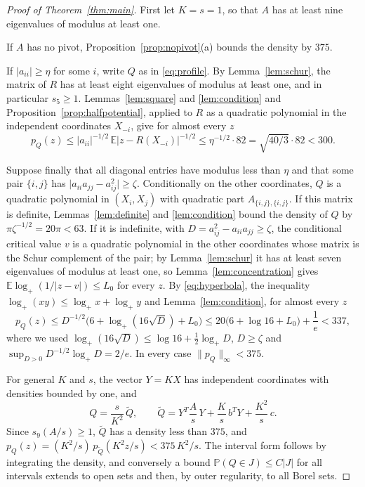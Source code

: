 \documentclass[11pt]{amsart}
\numberwithin{equation}{section}
\theoremstyle{definition}
\theoremstyle{remark}
\newcommand{\E}{\mathbb E}
\newcommand{\PP}{\mathbb P}
\newcommand{\1}{\mathbf 1}
\newcommand{\logp}{\log_+}
\newcommand{\norm}[1]{\lVert #1\rVert}
\newcommand{\abs}[1]{\lvert #1\rvert}
\begin{document}
\begin{proof}[Proof of Theorem~\ref{thm:main}]
First let $K=s=1$, so that $A$ has at least nine eigenvalues of modulus at least one.

If $A$ has no pivot, Proposition~\ref{prop:nopivot}(a) bounds the density by $375$.

If $\abs{a_{ii}}\ge\eta$ for some $i$, write $Q$ as in \eqref{eq:profile}. By Lemma~\ref{lem:schur}, the matrix of $R$ has at least eight eigenvalues of modulus at least one, and in particular $s_5\ge1$. Lemmas~\ref{lem:square} and \ref{lem:condition} and Proposition~\ref{prop:halfpotential}, applied to $R$ as a quadratic polynomial in the independent coordinates $X_{-i}$, give for almost every $z$
\[
p_Q(z)\le\abs{a_{ii}}^{-1/2}\,\E\abs{z-R(X_{-i})}^{-1/2}\le\eta^{-1/2}\cdot82=\sqrt{40/3}\cdot82<300 .
\]

Suppose finally that all diagonal entries have modulus less than $\eta$ and that some pair $\{i,j\}$ has $\abs{a_{ii}a_{jj}-a_{ij}^2}\ge\zeta$. Conditionally on the other coordinates, $Q$ is a quadratic polynomial in $(X_i,X_j)$ with quadratic part $A_{\{i,j\},\{i,j\}}$. If this matrix is definite, Lemmas~\ref{lem:definite} and \ref{lem:condition} bound the density of $Q$ by $\pi\zeta^{-1/2}=20\pi<63$. If it is indefinite, with $D=a_{ij}^2-a_{ii}a_{jj}\ge\zeta$, the conditional critical value $v$ is a quadratic polynomial in the other coordinates whose matrix is the Schur complement of the pair; by Lemma~\ref{lem:schur} it has at least seven eigenvalues of modulus at least one, so Lemma~\ref{lem:concentration} gives $\E\logp(1/\abs{z-v})\le L_0$ for every $z$. By \eqref{eq:hyperbola}, the inequality $\logp(xy)\le\logp x+\logp y$ and Lemma~\ref{lem:condition}, for almost every $z$
\[
p_Q(z)\le D^{-1/2}\bigl(6+\logp(16\sqrt D)+L_0\bigr)\le20\bigl(6+\log16+L_0\bigr)+\frac1e<337,
\]
where we used $\logp(16\sqrt D)\le\log16+\frac12\logp D$, $D\ge\zeta$ and $\sup_{D>0}D^{-1/2}\logp D=2/e$. In every case $\norm{p_Q}_\infty<375$.

For general $K$ and $s$, the vector $Y=KX$ has independent coordinates with densities bounded by one, and
\[
Q=\frac s{K^2}\,\widetilde Q,\qquad\widetilde Q=Y^T\frac As\,Y+\frac Ks\,b^TY+\frac{K^2}s\,c .
\]
Since $s_9(A/s)\ge1$, $\widetilde Q$ has a density less than $375$, and $p_Q(z)=(K^2/s)\,p_{\widetilde Q}(K^2z/s)<375\,K^2/s$. The interval form follows by integrating the density, and conversely a bound $\PP(Q\in J)\le C\abs J$ for all intervals extends to open sets and then, by outer regularity, to all Borel sets.
\end{proof}
\end{document}
